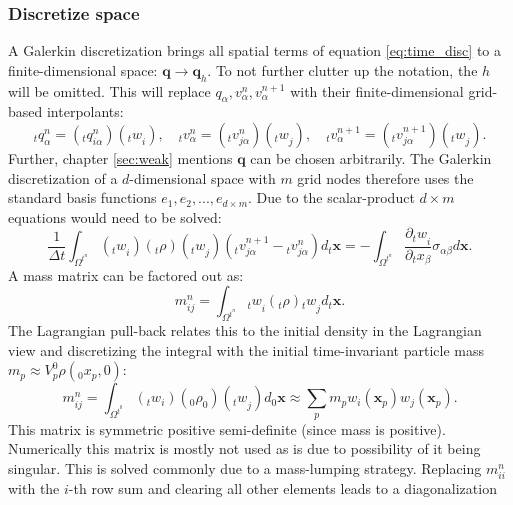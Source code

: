 \documentclass[m,times]{cgMA}
\begin{document}
\subsubsection{Discretize space}
A Galerkin discretization brings all spatial terms of equation \ref{eq:time_disc} to a finite-dimen\-sion\-al space: $\boldsymbol{q} \rightarrow \boldsymbol{q}_h$. To not further clutter up the notation, the $h$ will be omitted. This will replace $q_\alpha, v^n_\alpha , v_\alpha^{n+1}$ with their finite-dimensional grid-based interpolants:
\begin{equation}
  {_t q } _ { \alpha } ^ {  { n } } =  ({_t q } _ {  { i } \alpha } ^ {  { n } })  ({_t w } _ { i }) , \quad _tv _ { \alpha } ^ {  { n } } = ({_tv _ {  { j\alpha } } ^ {  { n } }} )( {_t w } _ {  { j } }) , \quad {_tv _ { \alpha } ^ {  { n } + 1 }} = ({_tv _ {  { j } \alpha } ^ {  { n } + 1 }}) ({_t w } _ {  { j } }).
\end{equation}
Further, chapter \ref{sec:weak} mentions $\boldsymbol{q}$ can be chosen arbitrarily. The Galerkin discretization of a $d$-dimensional space with $m$ grid nodes therefore uses the standard basis functions $e_1,e_2, ... ,e_{d \times m}$. Due to the scalar-product $d\times m$ equations would need to be solved:
\begin{equation}\label{eq:galerkin}
  \frac{1}{\Delta t} \int _{ \Omega^{t^n}} ({ _tw } _ {i  })(_t\rho)({_t w } _ { j  })({_tv_{j\alpha}^{n+1}}-{_tv_{j\alpha}^{n}}) d_t\boldsymbol{x} =
 - \int _ { \Omega ^ {  t^ n } }   \frac{\partial{_t w } _ { {i  }}}{\partial_tx_\beta }  \sigma _ {{ \alpha } \beta }  { d } \boldsymbol { x }.
\end{equation}
A mass matrix can be factored out as:
\begin{equation}
  m_{ij}^n = \int _{ \Omega^{t^n}} {_t w } _ {i  }(_t\rho){_t w } _ { j  } d_t\boldsymbol{x}.
\end{equation}
The Lagrangian pull-back relates this to the initial density in the Lagrangian view and discretizing the integral with the initial time-invariant particle mass $m_p \approx V_p^0\rho(_0x_p,0)$:
\begin{equation}
m_{ij}^n = \int _{ \Omega^{t^0}} ({_tw_i})(_0\rho_0)({_tw} _ { j  }) d_0 \boldsymbol{x} \approx \sum _ {  { p } }  { m } _ {  { p } }  { w } _ {  { i } } (\boldsymbol { x } _ {  { p } } )  { w } _ {  { j } } ( \boldsymbol { x } _ {  { p } } ).
\end{equation}
This matrix is symmetric positive semi-definite (since mass is positive). Numerically this matrix is mostly not used as is due to possibility of it being singular. This is solved commonly due to a mass-lumping strategy. Replacing $m^n_{ii}$ with the $i$-th row sum and clearing all other elements leads to a diagonalization
\end{document}
